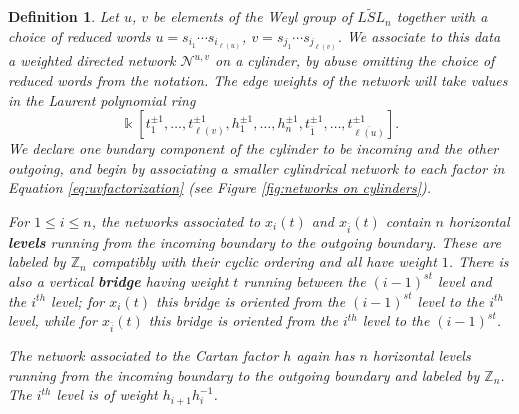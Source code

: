 \documentclass[12pt]{amsart}
\newcommand{\sayHW}[1]{\say[HW]{\color{violet}{\bf HW:}\;#1}}
\newcommand{\sayDR}[1]{\say[DR]{\color{red}{\bf DR:}\;#1}}
\newcommand{\newword}[1]{\textbf{\emph{#1}}}
\newcommand{\ZZ}{\mathbb{Z}}
\newcommand{\kk}{\Bbbk}%
\newcommand{\cN}{\mathcal{N}} %
\newcommand{\ol}[1]{\overline{#1}}
\newtheorem{definition}[theorem]{Definition}
\theoremstyle{remark}
\numberwithin{equation}{section}
\numberwithin{figure}{section}
\begin{document}
\begin{definition}\label{def:network}
Let $u$, $v$ be elements of the Weyl group of $\widetilde{LSL}_n$ together with a choice of reduced words $u=s_{i_1}\cdots s_{i_{\ell(u)}}$, $v=s_{j_1}\cdots s_{j_{\ell(v)}}$. We associate to this data a weighted directed network $\cN^{u,v}$ on a cylinder, by abuse omitting the choice of reduced words from the notation. The edge weights of the network will take values in the Laurent polynomial ring
\[
\kk[t_{1}^{\pm1},\dotsc,t_{\ell(v)}^{\pm 1},h_1^{\pm 1},\dotsc,h_{n}^{\pm 1},t_{\ol{1}}^{\pm 1},\dotsc,t_{\ol{\ell(u)}}^{\pm 1}].
\] 
We declare one bundary component of the cylinder to be incoming and the other outgoing, and begin by associating a smaller cylindrical network to each factor in Equation \ref{eq:uvfactorization} (see Figure \ref{fig:networks on cylinders}). 

For $1 \leq i \leq n$, the networks associated to $x_i(t)$ and $x_{\ol{i}}(t)$ contain $n$ horizontal \newword{levels} running from the incoming boundary to the outgoing boundary. These are labeled by $\ZZ_n$ compatibly with their cyclic ordering and all have weight $1$. There is also a vertical \newword{bridge} having weight $t$ running between the $(i-1)^{st}$ level and the $i^{th}$ level; for $x_i(t)$ this bridge is oriented from the $(i-1)^{st}$ level to the $i^{th}$ level, while for $x_{\ol{i}}(t)$ this bridge is oriented from the $i^{th}$ level to the $(i-1)^{st}$.


The network associated to the Cartan factor $h$ again has $n$ horizontal levels running from the incoming boundary to the outgoing boundary and labeled by $\ZZ_n$. The $i^{th}$ level is of weight $h_{i+1}h_{i}^{-1}$. 


\end{definition}
\end{document}
